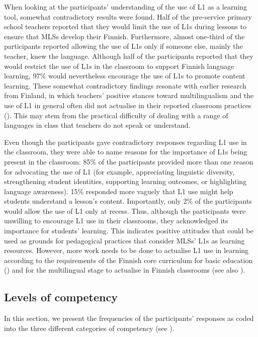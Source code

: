 \documentclass[output=paper]{langscibook}
\begin{document}
When looking at the participants’ understanding of the use of L1 as a learning tool, somewhat contradictory results were found. Half of the pre-service primary school teachers reported that they would limit the use of L1s during lessons to ensure that MLSs develop their Finnish. Furthermore, almost one-third of the participants reported allowing the use of L1s only if someone else, mainly the teacher, knew the language. Although half of the participants reported that they would restrict the use of L1s in the classroom to support Finnish language learning, 97\% would nevertheless encourage the use of L1s to promote content learning. These somewhat contradictory findings resonate with earlier research from Finland, in which teachers’ positive stances toward multilingualism and the use of L1 in general often did not actualise in their reported classroom practices (\citealt{AlisaariEtAl2019}). This may stem from the practical difficulty of dealing with a range of languages in class that teachers do not speak or understand.

Even though the participants gave contradictory responses regarding L1 use in the classroom, they were able to name reasons for the importance of L1s being present in the classroom: 85\% of the participants provided more than one reason for advocating the use of L1 (for example, appreciating linguistic diversity, strengthening student identities, supporting learning outcomes, or highlighting language awareness). 15\% responded more vaguely that L1 use might help students understand a lesson’s content. Importantly, only 2\% of the participants would allow the use of L1 only at recess. Thus, although the participants were unwilling to encourage L1 use in their classrooms, they acknowledged its importance for students’ learning. This indicates positive attitudes that could be used as grounds for pedagogical practices that consider MLSs’ L1s as learning resources. However, more work needs to be done to actualise L1 use in learning according to the requirements of the Finnish core curriculum for basic education (\citealt{Finnish_national_agency_of_education2014}) and for the multilingual stage to actualise in Finnish classrooms (see also \citealt{AroninSingleton2018}).

\subsection{Levels of competency}\label{sec:alisaari:4.2}

In this section, we present the frequencies of the participants’ responses as coded into the three different categories of competency (see ).
\end{document}
